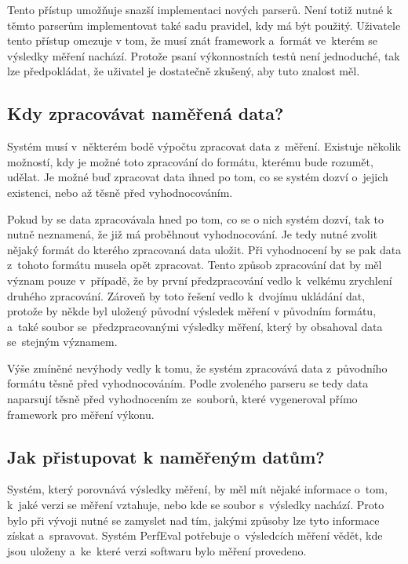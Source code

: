Tento přístup umožňuje snazší implementaci nových parserů. Není totiž nutné k těmto parserům implementovat
také sadu pravidel, kdy má být použitý. Uživatele tento přístup omezuje v tom, že musí znát framework a~formát
ve~kterém se výsledky měření nachází. Protože psaní výkonnostních testů není jednoduché, tak lze předpokládat,
že uživatel je dostatečně zkušený, aby tuto znalost měl.

\subsection{Kdy zpracovávat naměřená data?}

Systém musí v~některém bodě výpočtu zpracovat data z~měření. Existuje několik možností, kdy
je možné toto zpracování do formátu, kterému bude rozumět, udělat. Je možné buď zpracovat
data ihned po tom, co se systém dozví o~jejich existenci, nebo až těsně před vyhodnocováním.

Pokud by se data zpracovávala hned po tom, co se o nich systém dozví, tak to nutně neznamená,
že již má proběhnout vyhodnocování. Je tedy nutné zvolit nějaký formát do kterého zpracovaná data
uložit. Při vyhodnocení by se pak data z~tohoto formátu musela opět zpracovat. Tento způsob
zpracování dat by měl význam pouze v~případě, že by první předzpracování vedlo k~velkému
zrychlení druhého zpracování. Zároveň by toto řešení vedlo k~dvojímu ukládání dat, protože
by někde byl uložený původní výsledek měření v původním formátu, a~také soubor se~předzpracovanými
výsledky měření, který by obsahoval data se~stejným významem.

Výše zmíněné nevýhody vedly k tomu, že systém zpracovává data z~původního formátu těsně před
vyhodnocováním. Podle zvoleného parseru se tedy data naparsují těsně před vyhodnocením ze~souborů,
které vygeneroval přímo framework pro měření výkonu.

\subsection{Jak přistupovat k naměřeným datům?}

Systém, který porovnává výsledky měření, by měl mít nějaké informace o~tom, k~jaké verzi se měření vztahuje, nebo kde
se soubor s~výsledky nachází. Proto bylo při vývoji nutné se zamyslet nad tím, jakými způsoby lze tyto informace získat a~spravovat.
Systém PerfEval potřebuje o~výsledcích měření vědět, kde jsou uloženy a~ke~které verzi softwaru bylo měření provedeno.

